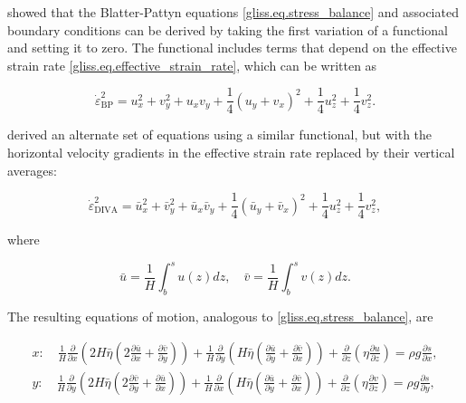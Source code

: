 {\citet{DUKOWICZ:2010wb} showed that the Blatter-Pattyn equations \eqref{gliss.eq.stress_balance} 
and associated boundary conditions can be derived by taking the first variation of a functional
and setting it to zero. The functional includes terms that depend on the effective strain rate
\eqref{gliss.eq.effective_strain_rate}, which can be written as

\begin{equation}
  \label{gliss.eq.effstrainrate_BP}
  \dot{\varepsilon }_{\mathrm{BP}}^{2} = u_{x}^{2} + v_{y}^{2} + {{u}_{x}}{{v}_{y}} 
                              + \frac{1}{4}{{\left( {{u}_{y}}+{{v}_{x}} \right)}^{2}}
                              + \frac{1}{4}u_{z}^{2} + \frac{1}{4}v_{z}^{2}.
\end{equation}

\noindent
\citet{Goldberg2011} derived an alternate set of equations using a similar functional,
but with the horizontal velocity gradients in the effective strain rate replaced by
their vertical averages:

\begin{equation}
  \label{gliss.eq.effstrainrate_DIVA}
  \dot{\varepsilon }_{\mathrm{DIVA}}^{2} = 
    \bar{u}_{x}^{2} + \bar{v}_{y}^{2} + {{\bar{u}}_{x}}{{\bar{v}}_{y}} 
    + \frac{1}{4}{{\left( {{\bar{u}}_{y}}+{{\bar{v}}_{x}} \right)}^{2}}
    + \frac{1}{4}u_{z}^{2} + \frac{1}{4}v_{z}^{2},
\end{equation}

\noindent
where

\begin{equation}
  \label{gliss.eq.vert_avg_velocity}
  \bar{u} = \frac{1}{H}\int_{b}^{s}{u(z)dz}, \quad \bar{v} = \frac{1}{H}\int_{b}^{s}{v(z)dz}.
\end{equation}

\noindent
The resulting equations of motion, analogous to \eqref{gliss.eq.stress_balance}, are

\begin{equation}
  \label{gliss.eq.stress_balance_DIVA}
  \begin{split}
    x: \quad \frac{1}{H} \frac{\partial }{\partial x}\left( 2H \bar{\eta} \left(2\frac{\partial \bar{u}}{\partial x} + \frac{\partial \bar{v}}{\partial y} \right) \right) 
           + \frac{1}{H} \frac{\partial }{\partial y}\left(  H \bar{\eta} \left( \frac{\partial \bar{u}}{\partial y} + \frac{\partial \bar{v}}{\partial x} \right) \right) 
           +\frac{\partial }{\partial z}\left( \eta \frac{\partial u}{\partial z} \right) 
           = \rho g\frac{\partial s}{\partial x}, \\
    y: \quad \frac{1}{H} \frac{\partial }{\partial y}\left( 2H \bar{\eta} \left(2\frac{\partial \bar{v}}{\partial y} + \frac{\partial \bar{u}}{\partial x} \right) \right) 
           + \frac{1}{H} \frac{\partial }{\partial x}\left(  H \bar{\eta} \left( \frac{\partial \bar{u}}{\partial y} + \frac{\partial \bar{v}}{\partial x} \right) \right) 
           + \frac{\partial }{\partial z}\left( \eta \frac{\partial v}{\partial z} \right) 
           = \rho g\frac{\partial s}{\partial y},  \\
  \end{split}
\end{equation}

}

